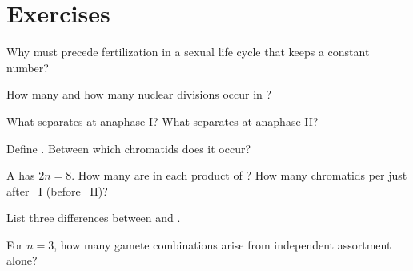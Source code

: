 \section{Exercises}

\begin{exercise}[$\star$]\label{exo:g11:meiosis-life-cycles:1}
Why must  precede fertilization in a sexual life cycle that keeps a
constant  number?
\end{exercise}

\begin{exercise}[$\star$]\label{exo:g11:meiosis-life-cycles:2}
How many  and how many nuclear divisions occur in ?
\end{exercise}

\begin{exercise}[$\star$]\label{exo:g11:meiosis-life-cycles:3}
What separates at anaphase I? What separates at anaphase II?
\end{exercise}

\begin{exercise}[$\star\star$]\label{exo:g11:meiosis-life-cycles:4}
Define . Between which chromatids does it occur?
\end{exercise}

\begin{exercise}[$\star\star$]\label{exo:g11:meiosis-life-cycles:5}
A  has $2n = 8$. How many  are in each product of ? How
many chromatids per  just after ~I (before ~II)?
\end{exercise}

\begin{exercise}[$\star\star$]\label{exo:g11:meiosis-life-cycles:6}
List three differences between  and .
\end{exercise}

\begin{exercise}[$\star\star$]\label{exo:g11:meiosis-life-cycles:7}
For $n = 3$, how many gamete  combinations arise from independent
assortment alone?
\end{exercise}


